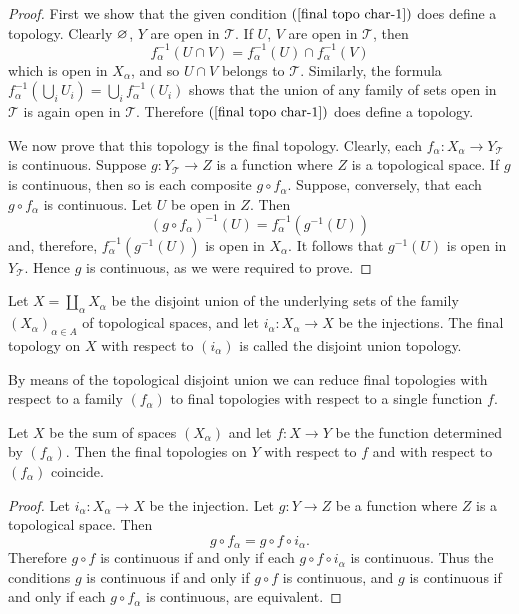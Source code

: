 \begin{proof}
First we show that the given condition $(\ref{final topo char-1})$ does define a topology. Clearly $\varnothing$, $Y$ are open in $\mathcal{T}$. If $U$, $V$ are open in 
$\mathcal{T}$, then
\[f_\alpha^{-1}(U\cap V)=f_\alpha^{-1}(U)\cap f^{-1}_\alpha(V)\]
which is open in $X_\alpha$, and so $U\cap V$ belongs to $\mathcal{T}$. Similarly, the formula $f_\alpha^{-1}(\bigcup_iU_i)=\bigcup_if_\alpha^{-1}(U_i)$ shows that the 
union of any family of sets open in $\mathcal{T}$ is again open in $\mathcal{T}$. Therefore $(\ref{final topo char-1})$ does define a topology.\par
We now prove that this topology is the final topology. Clearly, each $f_\alpha:X_\alpha\to Y_{\mathcal{T}}$ is continuous. Suppose $g:Y_{\mathcal{T}}\to Z$ is a function 
where $Z$ is a topological space. If $g$ is continuous, then so is each composite $g\circ f_\alpha$. Suppose, conversely, that each $g\circ f_\alpha$ is continuous. Let 
$U$ be open in $Z$. Then
\[(g\circ f_\alpha)^{-1}(U)=f_\alpha^{-1}(g^{-1}(U))\]
and, therefore, $f^{-1}_\alpha(g^{-1}(U))$ is open in $X_\alpha$. It follows that $g^{-1}(U)$ is open in $Y_\mathcal{T}$. Hence $g$ is continuous, as we were required 
to prove.
\end{proof}
\begin{example}
Let $X=\coprod_\alpha X_\alpha$ be the disjoint union of the underlying sets of the family $(X_\alpha)_{\alpha\in A}$ of topological spaces, and let $i_\alpha:X_\alpha\to X$ 
be the injections. The final topology on $X$ with respect to $(i_\alpha)$ is called the disjoint union topology.
\end{example}
By means of the topological disjoint union we can reduce final topologies with respect to a family $(f_\alpha)$ to final topologies with respect to a single function $f$.
\begin{proposition}
Let $X$ be the sum of spaces $(X_\alpha)$ and let $f:X\to Y$ be the function determined by $(f_\alpha)$. Then the final topologies on $Y$ with respect to $f$ and with 
respect to $(f_\alpha)$ coincide.
\end{proposition}
\begin{proof}
Let $i_\alpha:X_\alpha\to X$ be the injection. Let $g:Y\to Z$ be a function where $Z$ is a topological space. Then
\[g\circ f_\alpha=g\circ f\circ i_\alpha.\]
Therefore $g\circ f$ is continuous if and only if each $g\circ f\circ i_\alpha$ is continuous. Thus the conditions $g$ is continuous if and only if $g\circ f$ is 
continuous, and $g$ is continuous if and only if each $g\circ f_\alpha$ is continuous, are equivalent.
\end{proof}
